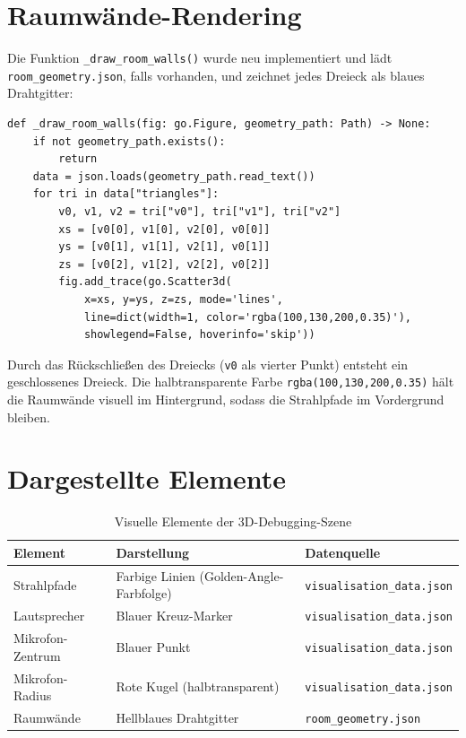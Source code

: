\documentclass[11pt,a4paper,twoside]{report}
\begin{document}
\section{Raumwände-Rendering}

Die Funktion \texttt{\_draw\_room\_walls()} wurde neu implementiert und l\"adt
\texttt{room\_geometry.json}, falls vorhanden, und zeichnet jedes Dreieck als
blaues Drahtgitter:

\begin{lstlisting}
def _draw_room_walls(fig: go.Figure, geometry_path: Path) -> None:
    if not geometry_path.exists():
        return
    data = json.loads(geometry_path.read_text())
    for tri in data["triangles"]:
        v0, v1, v2 = tri["v0"], tri["v1"], tri["v2"]
        xs = [v0[0], v1[0], v2[0], v0[0]]
        ys = [v0[1], v1[1], v2[1], v0[1]]
        zs = [v0[2], v1[2], v2[2], v0[2]]
        fig.add_trace(go.Scatter3d(
            x=xs, y=ys, z=zs, mode='lines',
            line=dict(width=1, color='rgba(100,130,200,0.35)'),
            showlegend=False, hoverinfo='skip'))
\end{lstlisting}

Durch das R\"uckschlie\ss{}en des Dreiecks (\texttt{v0} als vierter Punkt) entsteht
ein geschlossenes Dreieck. Die halbtransparente Farbe \texttt{rgba(100,130,200,0.35)}
h\"alt die Raumw\"ande visuell im Hintergrund, sodass die Strahlpfade im Vordergrund
bleiben.

\section{Dargestellte Elemente}

\begin{table}[H]
    \centering
    \begin{tabular}{|l|l|l|}
        \hline
        \textbf{Element} & \textbf{Darstellung} & \textbf{Datenquelle} \\
        \hline
        Strahlpfade & Farbige Linien (Golden-Angle-Farbfolge) & \texttt{visualisation\_data.json} \\
        \hline
        Lautsprecher & Blauer Kreuz-Marker & \texttt{visualisation\_data.json} \\
        \hline
        Mikrofon-Zentrum & Blauer Punkt & \texttt{visualisation\_data.json} \\
        \hline
        Mikrofon-Radius & Rote Kugel (halbtransparent) & \texttt{visualisation\_data.json} \\
        \hline
        Raumw\"ande & Hellblaues Drahtgitter & \texttt{room\_geometry.json} \\
        \hline
    \end{tabular}
    \caption{Visuelle Elemente der 3D-Debugging-Szene}
\end{table}
\end{document}
